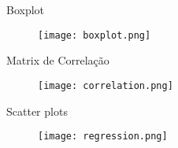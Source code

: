 \documentclass[8pt]{beamer}
\begin{document}
\begin{frame}{Boxplot}
\begin{figure}[h]
  \centering
  \texttt{[image: boxplot.png]}
\end{figure}
\end{frame}

\begin{frame}{Matrix de Correlação}
\begin{figure}[h]
  \centering
  \texttt{[image: correlation.png]}
\end{figure}
\end{frame}

\begin{frame}{Scatter plots}
\begin{figure}[h]
  \centering
  \texttt{[image: regression.png]}
\end{figure}
\end{frame}
\end{document}
